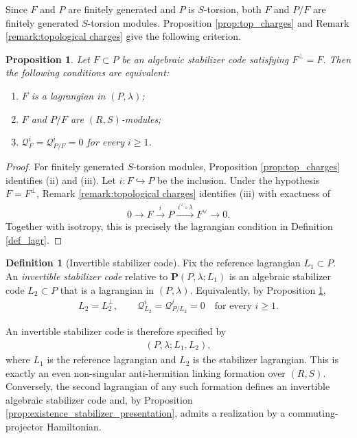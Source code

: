 \documentclass[sn-mathphys-num]{sn-jnl}
\newtheorem{proposition}[lemma]{Proposition}
\theoremstyle{definition}
\newtheorem{definition}[lemma]{Definition}
\numberwithin{equation}{section}
\theoremstyle{definition}
\def\CQ {{\mathcal Q}}
\def\l{{\lambda}}
\begin{document}
Since $F$ and $P$ are finitely generated and $P$ is $S$-torsion, both
$F$ and $P/F$ are finitely generated $S$-torsion modules. Proposition \ref{prop:top_charges} and Remark
\ref{remark:topological charges} give the following criterion.

\begin{proposition}\label{prop:invertibility_charges}
Let $F\subset P$ be an algebraic stabilizer code satisfying
$F^{\perp}=F$. Then the following conditions are equivalent:
\begin{enumerate}[label=(\roman*)]
    \item $F$ is a lagrangian in $(P,\l)$;
    \item $F$ and $P/F$ are $(R,S)$-modules;
    \item $\CQ_F^i=\CQ_{P/F}^i=0$ for every $i\geqslant1$.
\end{enumerate}
\end{proposition}

\begin{proof}
For finitely generated $S$-torsion modules, Proposition
\ref{prop:top_charges} identifies (ii) and (iii). Let
$i:F\hookrightarrow P$ be the inclusion. Under the hypothesis
$F=F^{\perp}$, Remark \ref{remark:topological charges} identifies (iii)
with exactness of
\begin{align}
    0\longrightarrow F\xrightarrow{\,i\,}P
    \xrightarrow{\,i^{\vee}\circ\l\,}F^{\vee}
    \longrightarrow0.
\end{align}
Together with isotropy, this is precisely the lagrangian condition in
Definition \ref{def_lagr}.
\end{proof}

\begin{definition}[Invertible stabilizer code]
\label{def:invertible_stabilizer_code}
Fix the reference lagrangian $L_1\subset P$. An \textit{invertible
stabilizer code} relative to $\textbf{P}(P,\l;L_1)$ is an algebraic
stabilizer code $L_2\subset P$ that is a lagrangian in $(P,\l)$.
Equivalently, by Proposition \ref{prop:invertibility_charges},
\begin{align}
    L_2=L_2^{\perp},
    \qquad
    \CQ_{L_2}^i=\CQ_{P/L_2}^i=0
    \quad\text{for every }i\geqslant1.
\end{align}
\end{definition}

An invertible stabilizer code is therefore specified by
\begin{align}\label{eq:code_formation}
    (P,\l;L_1,L_2),
\end{align}
where $L_1$ is the reference lagrangian and $L_2$ is the stabilizer
lagrangian. This is exactly an even non-singular anti-hermitian linking
formation over $(R,S)$. Conversely, the second lagrangian of any such
formation defines an invertible algebraic stabilizer code and, by Proposition
\ref{prop:existence_stabilizer_presentation}, admits a realization  by a commuting-projector
Hamiltonian. 
\end{document}
